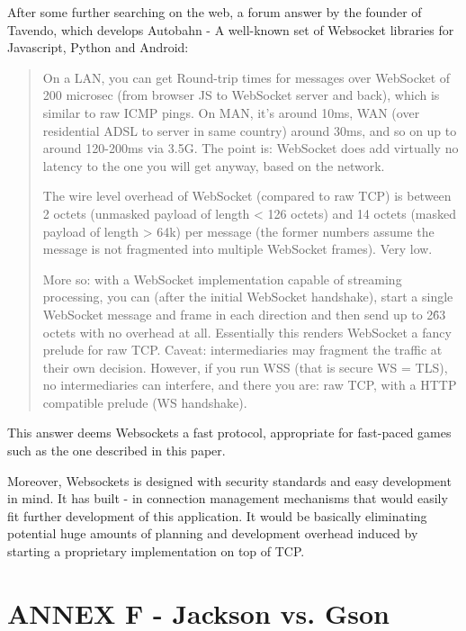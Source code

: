 \documentclass{article}
\begin{document}
After some further searching on the web, a forum answer\cite{websockets3} by the
founder of Tavendo, which develops Autobahn - A well-known set of Websocket libraries for
Javascript, Python and Android:\newline

\begin{quotation}
On a LAN, you can get Round-trip times for messages over WebSocket of 200
microsec (from browser JS to WebSocket server and back), which is similar to raw
ICMP pings. On MAN, it's around 10ms, WAN (over residential ADSL to server in
same country) around 30ms, and so on up to around 120-200ms via 3.5G. The point
is: WebSocket does add virtually no latency to the one you will get anyway,
based on the network.\newline

The wire level overhead of WebSocket (compared to raw TCP) is between 2 octets
(unmasked payload of length < 126 octets) and 14 octets (masked payload of
length > 64k) per message (the former numbers assume the message is not
fragmented into multiple WebSocket frames). Very low.\newline

More so: with a WebSocket implementation capable of streaming processing, you
can (after the initial WebSocket handshake), start a single WebSocket message
and frame in each direction and then send up to 2\^63 octets with no overhead at
all. Essentially this renders WebSocket a fancy prelude for raw TCP. Caveat:
intermediaries may fragment the traffic at their own decision. However, if you
run WSS (that is secure WS = TLS), no intermediaries can interfere, and there
you are: raw TCP, with a HTTP compatible prelude (WS handshake).
\end{quotation}

This answer deems Websockets a fast protocol, appropriate for fast-paced games
such as the one described in this paper.\newline

Moreover, Websockets is designed with security standards and easy development in
mind. It has built - in connection management mechanisms that would easily fit
further development of this application. It would be basically eliminating
potential huge amounts of planning and development overhead induced by starting
a proprietary implementation on top of TCP. \newline

\section{ANNEX F - Jackson vs. Gson}
\end{document}
